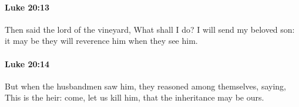 		\paragraph{Luke 20:13} %
			\label{LUKE-20-13}

			Then said the lord of the vineyard, What shall I do? I will send my beloved son: it may be they will reverence him when they see him.

			\begin{framed}
			\scriptsize
				\begin{compactdesc}
					\item[SBLG] 
				\end{compactdesc}
			\end{framed}

		\paragraph{Luke 20:14} %
			\label{LUKE-20-14}

			But when the husbandmen saw him, they reasoned among themselves, saying, This is the heir: come, let us kill him, that the inheritance may be ours.

